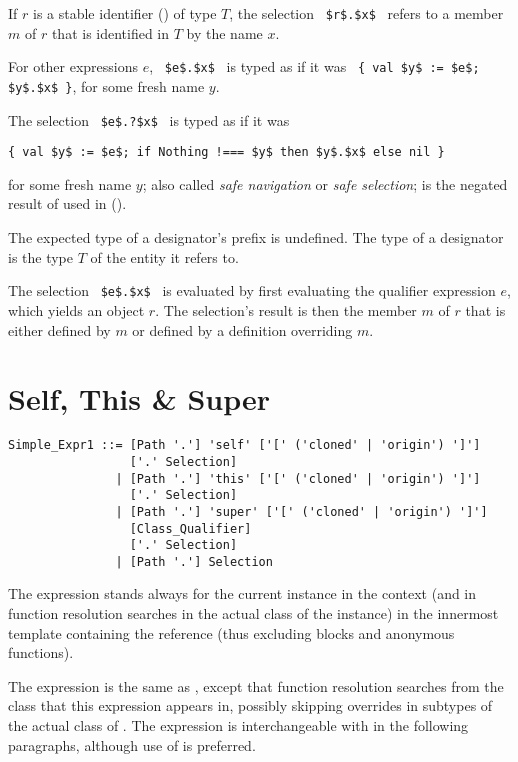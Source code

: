 If $r$ is a stable identifier () of type $T$, the selection ~\lstinline!$r$.$x$!~ refers to a member $m$ of $r$ that is identified in $T$ by the name $x$. 

For other expressions $e$, ~\lstinline!$e$.$x$!~ is typed as if it was ~\lstinline!{ val $y$ := $e$; $y$.$x$ }!, for some fresh name $y$. 

The selection ~\lstinline!$e$.?$x$!~ is typed as if it was 
\begin{lstlisting}
{ val $y$ := $e$; if Nothing !=== $y$ then $y$.$x$ else nil }
\end{lstlisting}
for some fresh name $y$; also called {\em safe navigation} or {\em safe selection}; \code{!===} is the negated result of \code{===} used in ().

The expected type of a designator's prefix is undefined. The type of a designator is the type $T$ of the entity it refers to. 

The selection ~\lstinline!$e$.$x$!~ is evaluated by first evaluating the qualifier expression $e$, which yields an object $r$. The selection's result is then the member $m$ of $r$ that is either defined by $m$ or defined by a definition overriding $m$. 







\section{Self, This \& Super}
\label{sec:self-this-super}

\syntax\begin{lstlisting}
Simple_Expr1 ::= [Path '.'] 'self' ['[' ('cloned' | 'origin') ']']
                 ['.' Selection]
               | [Path '.'] 'this' ['[' ('cloned' | 'origin') ']']
                 ['.' Selection]
               | [Path '.'] 'super' ['[' ('cloned' | 'origin') ']']
                 [Class_Qualifier] 
                 ['.' Selection]
               | [Path '.'] Selection
\end{lstlisting}

The expression  stands always for the current instance in the context (and in function resolution searches in the actual class of the instance) in the innermost template containing the reference (thus excluding blocks and anonymous functions). 

The expression  is the same as , except that function resolution searches from the class that this expression appears in, possibly skipping overrides in subtypes of the actual class of . The  expression is interchangeable with  in the following paragraphs, although use of  is preferred. 

